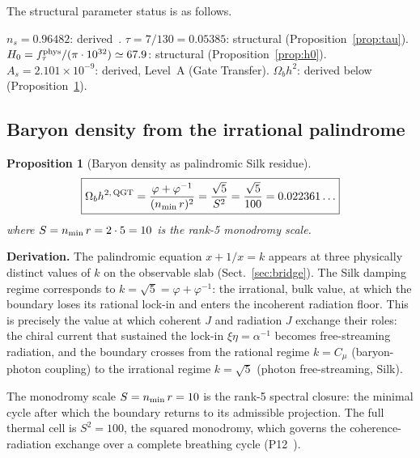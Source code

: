 \documentclass[twocolumn,10pt]{article}
\newcommand{\vp}{\varphi}
\newtheorem{proposition}[theorem]{Proposition}
\begin{document}
The structural parameter status is as follows.

$n_s=0.96482$: derived~\cite{CamKer163}.
$\tau=7/130=0.05385$: structural (Proposition~\ref{prop:tau}).
$H_0=f_\tau^{\rm phys}/(\pi\cdot10^{32})\simeq67.9$: structural
(Proposition~\ref{prop:h0}). $A_s=2.101\times10^{-9}$:
derived, Level~A (Gate Transfer).
$\Omega_bh^2$: derived below (Proposition~\ref{prop:ombh2}).

\subsection{Baryon density from the irrational palindrome}
\label{sec:ombh2}

\begin{proposition}[Baryon density as palindromic Silk residue]
\label{prop:ombh2}
\begin{equation}
  \boxed{
  \Omega_bh^{2,\,{\rm QGT}}
  = \frac{\vp+\vp^{-1}}{(n_{\rm min}\,r)^2}
  = \frac{\sqrt{5}}{S^2}
  = \frac{\sqrt{5}}{100}
  = 0.022361\ldots
  }
  \label{eq:ombh2}
\end{equation}
where $S=n_{\rm min}\,r=2\cdot5=10$ is the rank-5 monodromy scale.
\end{proposition}

\noindent\textbf{Derivation.}
The palindromic equation $x+1/x=k$ appears at three physically
distinct values of $k$ on the observable slab
(Sect.~\ref{sec:bridge}). The Silk damping regime corresponds to
$k=\sqrt{5}=\vp+\vp^{-1}$: the irrational, bulk value, at which
the boundary loses its rational lock-in and enters the
incoherent radiation floor. This is precisely the value at which
coherent $J$ and radiation $J$ exchange their roles: the chiral
current that sustained the lock-in $\xi\eta=\alpha^{-1}$ becomes
free-streaming radiation, and the boundary crosses from the
rational regime $k=C_\mu$ (baryon-photon coupling) to the
irrational regime $k=\sqrt{5}$ (photon free-streaming, Silk).

The monodromy scale $S=n_{\rm min}\,r=10$ is the rank-5 spectral
closure: the minimal cycle after which the boundary returns to its
admissible projection. The full thermal cell is $S^2=100$, the
squared monodromy, which governs the coherence-radiation exchange
over a complete breathing cycle (P12~\cite{CamP12}).
\end{document}
